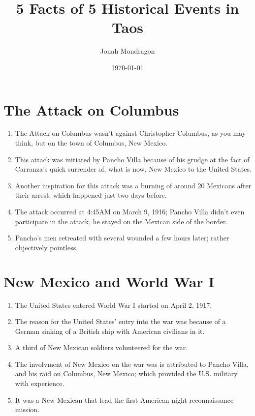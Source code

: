 \documentclass{article}
\title{5 Facts of 5 Historical Events in Taos}
\author{Jonah Mondragon}
\date{\today}
\begin{document}
\pagestyle{plain}

\section{The Attack on Columbus}
\begin{enumerate}
    \item{The Attack on Columbus wasn't against Christopher Columbus, as you may think, but on the town of Columbus, New Mexico.}
    \item{This attack was initiated by {\color{blue}\underline{\href{https://www.history.com/topics/mexico/pancho-villa}{Pancho Villa}}} because of his grudge at the fact of Carranza's quick surrender of, what is now, New Mexico to the United States.}
    \item{Another inspiration for this attack was a burning of around 20 Mexicans after their arrest; which happened just two days before.}
    \item{The attack occurred at 4:45AM on March 9, 1916; Pancho Villa didn't even participate in the attack, he stayed on the Mexican side of the border.}
    \item{Pancho's men retreated with several wounded a few hours later; rather objectively pointless.}
\end{enumerate}

\section{New Mexico and World War I}
\begin{enumerate}
    \item{The United States entered World War I started on April 2, 1917.}
    \item{The reason for the United States' entry into the war was because of a German sinking of a British ship with American civilians in it.}
    \item{A third of New Mexican soldiers volunteered for the war.}\label{TEST}
    \item{The involvment of New Mexico on the war was is attributed to Pancho Villa, and his raid on Columbus, New Mexico; which provided the U.S. military with experience.}
    \item{It was a New Mexican that lead the first American night reconnaissance mission.}
\end{enumerate}
\end{document}
